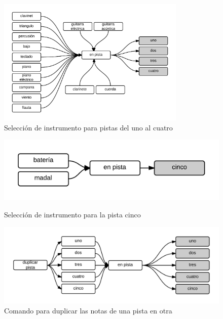 \begin{figure}[H]
\centering
\includegraphics[width=0.8\textwidth]{./graphics/inst-p1-4.png}
\caption{Selecci\'on de instrumento para pistas del uno al cuatro}
\label{figure:cmd-inst-p1-4}
\end{figure}

\begin{figure}[H] 
\begin{minipage}[b]{0.5\linewidth}
\centering
\includegraphics[width=1\linewidth]{./graphics/inst-p5.png}
\caption{Selecci\'on de instrumento para la pista cinco}
\label{figure:cmd-inst-p5}
\end{minipage}
\quad
\begin{minipage}[b]{0.5\linewidth}
\centering
\includegraphics[width=1\linewidth]{./graphics/dup-pista.png}
\caption{Comando para duplicar las notas de una pista en otra}
\label{figure:cmd-dup-pista}
\end{minipage}
\end{figure}

